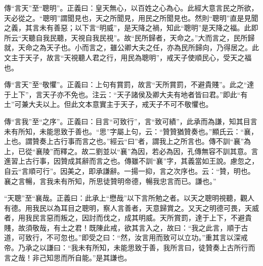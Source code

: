 {\noindent\zhuan{}\fzbyks 傳“言天”至“聰明”。正義曰：皇天無心，以百姓之心為心。此經大意言民之所欲，天必從之。“聰明”謂聞見也，天之所聞見，用民之所聞見也。然則“聰明”直是見聞之義，其言未有善惡；以下言“明威”，是天降之禍，知此“聰明”是天降之福。此即所云“天聽自我民聽，天視自我民視”。故“民所歸者，天命之。”大而言之，民所歸就，天命之為天子也。小而言之，雖公卿大夫之任，亦為民所歸向，乃得居之。此文主于天子，故言“天視聽人君之行，用民為聰明”，戒天子使順民心，受天之福也。 \par}

{\noindent\zhuan{}\fzbyks 傳“言天”至“敬懼”。正義曰：上句有賞罰，故言“天所賞罰，不避貴賤”。此之“達于上下”，言天子亦不免也。注云：“天子諸侯及卿大夫有地者皆曰君。”即此“有土”可兼大夫以上。但此文本意實主于天子，戒天子不可不敬懼也。 \par}

{\noindent\zhuan{}\fzbyks 傳“言我”至“之序”。正義曰：目言“可致行”，言“致可績”，此承而為謙，知其目言未有所知，未能思致于善也。“思”字屬上句，云：“贊贊猶贊奏也。”顯氏云：“襄，上也。謂贊奏上古行事而言之也。”經云“曰”者，謂我上之所言也。傳不訓“襄”為上，已從“襄陵”而釋之。故二劉並以“襄”為因，若必為因，孔傳無容不訓其意。言進習上古行事，因贊成其辭而言之也。傳雖不訓“襄”字，其義當如王說。慮忽之，自云“言順可行”。因美之，即承謙辭。一揚一抑，言之次序也。云：“贊，明也。襄之言暢，言我未有所知，所思徒贊明帝德，暢我忠言而已。謙也。” \par}

{\noindent\shu{}\fzkt “天聰”至“襄哉。正義曰：此承上“懋哉”以下言所勉之者。以天之聰明視聽，觀人有德。用我民以為耳目之聰明，察人言善者，天意歸賞之。又天之明德可畏，天威者，用我民言惡而叛之，因討而伐之，成其明威。天所賞罰，達于上下，不避貴賤，故須敬哉，有土之君！既陳此戒，欲其言入之，故曰：“我之此言，順于古道，可致行，不可忽也。”即受之曰：“然，汝言用而致可以立功。”重其言以深戒帝。乃承之以謙曰：“我未有所知，未能思致于善，我所言曰，徒贊奏上古所行而言之哉！非己知思而所自能。”是其謙也。 \par}

